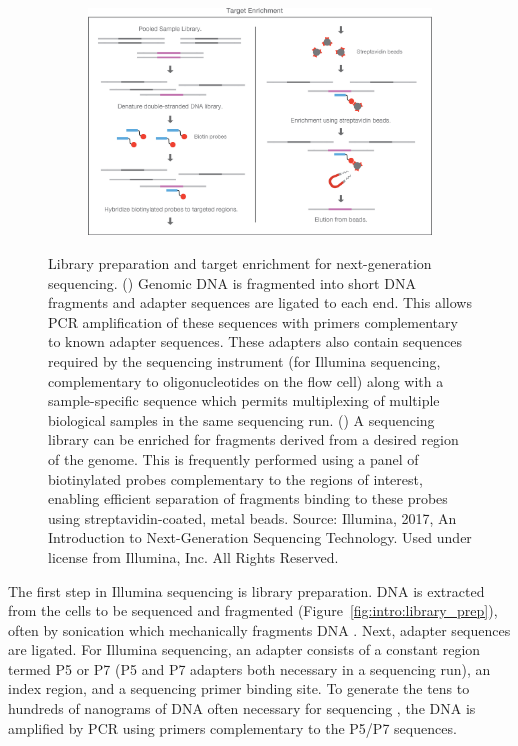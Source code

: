\begin{figure}[htb]
\begin{subfigure}{0.25\textwidth}
    \end{subfigure}%
    \hfill%
    \begin{subfigure}{0.73\textwidth}
        \includegraphics[width=\linewidth,keepaspectratio]{images/intro/illumina_library_enrichment}
        \caption{}\label{fig:intro:library_enrichment}
    \end{subfigure}
	\vspace{-0.3cm}
    \caption[Library preparation for NGS.]{Library preparation and target enrichment for next-generation sequencing. () Genomic DNA is fragmented into short DNA fragments and adapter sequences are ligated to each end. This allows PCR amplification of these sequences with primers complementary to known adapter sequences. These adapters also contain sequences required by the sequencing instrument (for Illumina sequencing, complementary to oligonucleotides on the flow cell) along with a sample-specific sequence which permits multiplexing of multiple biological samples in the same sequencing run. () A sequencing library can be enriched for fragments derived from a desired region of the genome. This is frequently performed using a panel of biotinylated probes complementary to the regions of interest, enabling efficient separation of fragments binding to these probes using streptavidin-coated, metal beads. Source: Illumina, 2017, An Introduction to Next-Generation Sequencing Technology. Used under license from Illumina, Inc. All Rights Reserved.}
    \label{fig:intro:seq_library}
\end{figure}
The first step in Illumina sequencing is library preparation. DNA is extracted from the cells to be sequenced and fragmented (Figure~\ref{fig:intro:library_prep}), often by sonication which mechanically fragments DNA \cite{sambrook2006}. Next, adapter sequences are ligated. For Illumina sequencing, an adapter consists of a constant region termed P5 or P7 (P5 and P7 adapters both necessary in a sequencing run), an index region, and a sequencing primer binding site. To generate the tens to hundreds of nanograms of DNA often necessary for sequencing \cite{aigrain2016}, the DNA is amplified by PCR using primers complementary to the P5/P7 sequences.

